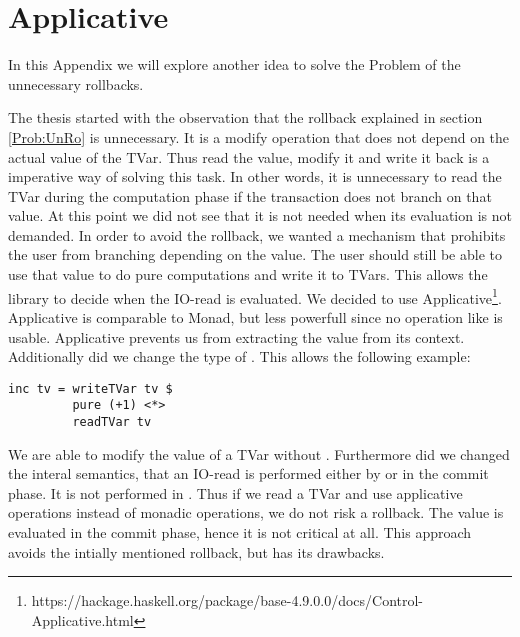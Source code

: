 
\chapter{Applicative} %

\label{AppendixA} %
In this Appendix we will explore another idea to solve the Problem of the unnecessary rollbacks.

The thesis started with the observation that the rollback explained in section \ref{Prob:UnRo} is 
unnecessary. It is a modify operation that does not depend on the actual value of the TVar. Thus 
read the value, modify it and write it back is a imperative way of solving this task. In other 
words, it is unnecessary to read the TVar during the computation phase if the transaction does
not branch on that value. At this point we did not see that it is not needed when its evaluation is
not demanded. In order to avoid the rollback, we wanted a mechanism that prohibits the user from 
branching depending on the value. The user should still be able to use that value to do pure computations and 
write it to TVars. This allows the library to decide when the IO-read is evaluated. We decided to 
use Applicative\footnote{https://hackage.haskell.org/package/base-4.9.0.0/docs/Control-Applicative.html}.
Applicative is comparable to Monad, but less powerfull since no operation like \code{>>=} is usable.
Applicative prevents us from extracting the value from its context.
Additionally did we change the type of . 
This allows the following
example: 
\begin{lstlisting}
inc tv = writeTVar tv $ 
         pure (+1) <*> 
         readTVar tv
\end{lstlisting}
We are able to modify the value of a TVar without \code{>>=}. Furthermore did we changed the interal
semantics, that an IO-read is performed either by \code{>>=} or in the commit phase. It is not performed
in . Thus if we read a TVar and use applicative operations instead of monadic operations,
we do not risk a rollback. The value is evaluated in the commit phase, hence it is not critical at all.
This approach avoids the intially mentioned rollback, but has its drawbacks. 

